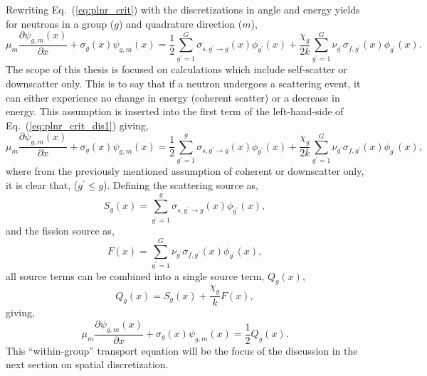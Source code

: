 \noindent
	\indent Rewriting Eq.~(\ref{eq:plnr_crit}) with the discretizations in angle and energy yields
	for neutrons in a group (${g}$) and quadrature direction (${m}$),
\begin{equation}
	\mu_{m}\frac{\partial{\psi_{g,m}}({x})}{\partial{x}}+{\sigma}_{g}({x}){\psi_{g,m}}({x}) = 
		\frac{1}{2}\sum^{G}_{g^{'}=1}{\sigma}_{s,g^{'}\rightarrow{g}}({x})\phi_{g^{'}}({x})
		+\frac{\chi_g}{2{k}}\sum^{G}_{g^{'}=1}\nu_{g^{'}}\sigma_{f,g^{'}}({x})\phi_{g^{'}}({x}).
	\label{eq:plnr_crit_dis1}
\end{equation}
	The scope of this thesis is focused on calculations which include self-scatter or downscatter only.
	This is to say that if a neutron undergoes a scattering event, it can either experience no change in
	energy (coherent scatter) or a decrease in energy. 	This assumption is inserted into the first term
	of the left-hand-side of Eq.~(\ref{eq:plnr_crit_dis1}) giving, 
\begin{equation}
	\mu_{m}\frac{\partial{\psi_{g,m}}({x})}{\partial{x}}+{\sigma}_{g}({x}){\psi_{g,m}}({x}) = 
		\frac{1}{2}{\sum^{g}_{g^{'}=1}}{\sigma}_{s,g^{'}\rightarrow{g}}({x})
		\phi_{g^{'}}({x})+\frac{\chi_g}{2{k}}\sum^{G}_{g^{'}=1}\nu_{g^{'}}\sigma_{f,g^{'}}({x})
		\phi_{g^{'}}({x}),
	\label{eq:plnr_crit_dis2}
\end{equation}
	where from the previously mentioned assumption of coherent or downscatter only, it is clear that, 
	(${g^{'} \le g}$).  Defining the scattering source as,
\begin{equation}
	S_{g}{(x)}={{\sum^{g}_{g^{'}=1}}{\sigma}_{s,g^{'}\rightarrow{g}}({x})
	\phi_{g^{'}}({x})},
	\label{eq:scat_src}
\end{equation}
	and the fission source as,	
\begin{equation}
	F{(x)}={\sum^{G}_{g^{'}=1}\nu_{g^{'}}\sigma_{f,g^{'}}({x})
		\phi_{g^{'}}({x})},
	\label{eq:fiss_src}
\end{equation}
	all source terms can be combined into a single source term, ${Q_{g}(x)}$,
\begin{equation}
	{Q_{g}(x)}={S_{g}{(x)}}+{\frac{\chi_g}{k}}F{(x)},
\end{equation}	
	giving,
\begin{equation}
	\mu_{m}\frac{\partial{\psi_{g,m}}({x})}{\partial{x}}+{\sigma}_{g}({x}){\psi_{g,m}}(x)=
	\frac{1}{2}{Q_{g}({x})}.
	\label{eq:plnr_crit_simp}
\end{equation}
	This ``within-group'' transport equation will be the focus of the discussion in the next section on
	spatial discretization.

